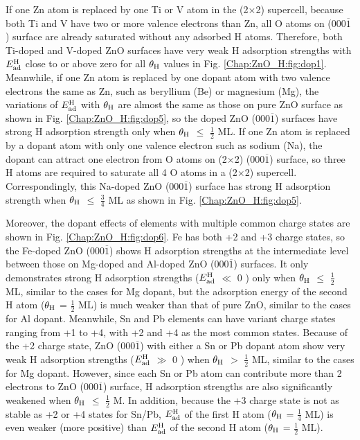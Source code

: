 If one Zn atom is replaced by one Ti or V atom in the (2$\times$2) supercell, because both Ti and V have two or more valence electrons than Zn, all O atoms on (000$\overline{1}$) surface are already saturated without any adsorbed H atoms. Therefore,  both Ti-doped and V-doped ZnO surfaces have very weak H adsorption strengths with $E_{\textup{ad}}^{\textup{H}}$ close to or above zero for all $\theta_{\textup{H}}$ values in Fig. \ref{Chap:ZnO_H:fig:dop1}. Meanwhile, if one Zn atom is replaced by one dopant atom with two valence electrons the same as Zn, such as beryllium (Be) or magnesium (Mg), the variations of $E_{\textup{ad}}^{\textup{H}}$ with $\theta_{\textup{H}}$ are almost the same as those on pure ZnO surface as shown in Fig. \ref{Chap:ZnO_H:fig:dop5}, so the doped ZnO (000$\overline{1}$) surfaces have strong H adsorption strength only when $\theta_{\textup{H}}$ $\leq$ $\frac{1}{2}$ ML. If one Zn atom is replaced by a dopant atom with only one valence electron such as sodium (Na), the dopant can attract one electron from O atoms on (2$\times$2)  (000$\overline{1}$) surface, so three H atoms are required to saturate all 4 O atoms in a (2$\times$2) supercell. Correspondingly, this Na-doped ZnO (000$\overline{1}$) surface has strong H adsorption strength when $\theta_{\textup{H}}$ $\leq$ $\frac{3}{4}$ ML  as shown in Fig. \ref{Chap:ZnO_H:fig:dop5}. 

Moreover, the dopant effects of elements with multiple common charge states are shown in Fig. \ref{Chap:ZnO_H:fig:dop6}. Fe has both +2 and +3 charge states, so the Fe-doped ZnO (000$\overline{1}$) shows H adsorption strengths at the intermediate level between those on Mg-doped and Al-doped ZnO (000$\overline{1}$) surfaces. It only demonstrates strong H adsorption strengths ($E_{\textup{ad}}^{\textup{H}}$ $\ll$ 0 ) only when $\theta_{\textup{H}}$ $\leq$ $\frac{1}{2}$ ML, similar to the cases for Mg dopant, but the adsorption energy of the second H atom ($\theta_{\textup{H}}$ = $\frac{1}{2}$ ML) is much weaker than that of pure ZnO,  similar to the cases for Al dopant. Meanwhile, Sn and Pb elements can have variant charge states ranging from +1 to +4, with +2 and +4 as the most common states\cite{Greenwood97}. Because of the +2 charge state, ZnO (000$\overline{1}$) with either a Sn or Pb dopant atom show very weak H adsorption strengths ($E_{\textup{ad}}^{\textup{H}}$ $\gg$ 0 ) when $\theta_{\textup{H}}$ $>$ $\frac{1}{2}$ ML, similar to the cases for Mg dopant.  However, since each Sn or Pb atom can contribute more than 2 electrons to ZnO (000$\overline{1}$) surface, H adsorption strengths are also significantly weakened when $\theta_{\textup{H}}$ $\leq$ $\frac{1}{2}$ M. In addition, because the +3 charge state is not as stable as +2 or +4 states for Sn/Pb\cite{Greenwood97}, $E_{\textup{ad}}^{\textup{H}}$ of the first H atom ($\theta_{\textup{H}}$ = $\frac{1}{4}$ ML) is even weaker (more positive) than $E_{\textup{ad}}^{\textup{H}}$ of the second H atom ($\theta_{\textup{H}}$ = $\frac{1}{2}$ ML).